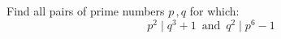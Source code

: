 Find all pairs of prime numbers $p\,,q$ for which:
\[p^2 \mid q^3 + 1 \,\,\, \text{and} \,\,\, q^2 \mid p^6-1\]

